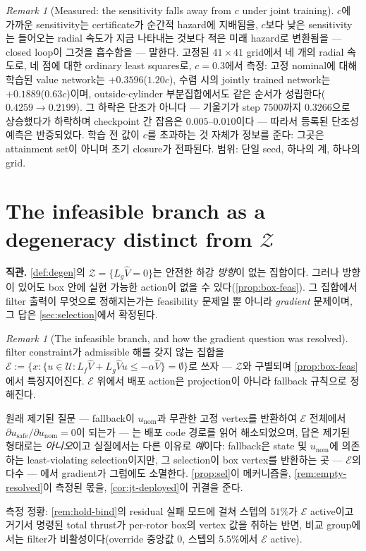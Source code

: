 \documentclass[11pt]{article}
\theoremstyle{plain}
\theoremstyle{definition}
\theoremstyle{remark}
\newtheorem{remark}[theorem]{Remark}
\newcommand{\calU}{\mathcal{U}}
\newcommand{\Vhat}{\widehat V}
\newcommand{\Lg}{L_g}
\newcommand{\Lf}{L_f}
\newcommand{\eqdef}{:=}
\begin{document}
\begin{remark}[Measured: the sensitivity falls away from $c$ under joint training]\label{rem:sens-measured}
$c$에 가까운 sensitivity는 certificate가 순간적 hazard에 지배됨을, $c$보다 낮은 sensitivity는
들어오는 radial 속도가 지금 나타내는 것보다 적은 미래 hazard로 변환됨을 --- closed loop이 그것을
흡수함을 --- 말한다. 고정된 $41\times41$ grid에서 네 개의 radial 속도로, 네 점에 대한 ordinary
least squares로, $c=0.3$에서 측정: 고정 nominal에 대해 학습된 value network는 $+0.3596$($1.20c$),
수렴 시의 jointly trained network는 $+0.1889$($0.63c$)이며, outside-cylinder 부분집합에서도 같은
순서가 성립한다($0.4259\to0.2199$). 그 하락은 단조가 아니다 --- 기울기가 step $7500$까지
$0.3266$으로 상승했다가 하락하며 checkpoint 간 잡음은 $0.005$--$0.010$이다 --- 따라서 등록된
단조성 예측은 반증되었다. 학습 전 값이 $c$를 초과하는 것 자체가 정보를 준다: 그곳은 attainment
set이 아니며 초기 closure가 전파된다. 범위: 단일 seed, 하나의 계, 하나의 grid.
\end{remark}

\section{The infeasible branch as a degeneracy distinct from \texorpdfstring{$\mathcal Z$}{Z}}\label{sec:empty}

\textbf{직관.} \cref{def:degen}의 $\mathcal Z=\{\Lg\Vhat=0\}$는 안전한 하강 \emph{방향}이 없는
집합이다. 그러나 방향이 있어도 box 안에 실현 가능한 action이 없을 수 있다(\cref{prop:box-feas}).
그 집합에서 filter 출력이 무엇으로 정해지는가는 feasibility 문제일 뿐 아니라 \emph{gradient}
문제이며, 그 답은 \cref{sec:selection}에서 확정된다.

\begin{remark}[The infeasible branch, and how the gradient question was resolved]\label{rem:empty-grad}
filter constraint가 admissible 해를 갖지 않는 집합을
$\mathcal E\eqdef\{x:\{u\in\calU:\Lf\Vhat+\Lg\Vhat u\le-\alpha\Vhat\}=\emptyset\}$로 쓰자 ---
$\mathcal Z$와 구별되며 \cref{prop:box-feas}에서 특징지어진다. $\mathcal E$ 위에서 배포 action은
projection이 아니라 fallback 규칙으로 정해진다.

원래 제기된 질문 --- fallback이 $u_{\mathrm{nom}}$과 무관한 고정 vertex를 반환하여 $\mathcal E$
전체에서 $\partial u_{\mathrm{safe}}/\partial u_{\mathrm{nom}}=0$이 되는가 --- 는 배포 code 경로를
읽어 해소되었으며, 답은 제기된 형태로는 \emph{아니오}이고 실질에서는 다른 이유로 \emph{예}이다:
fallback은 state 및 $u_{\mathrm{nom}}$에 의존하는 least-violating selection이지만, 그 selection이
box vertex를 반환하는 곳 --- $\mathcal E$의 다수 --- 에서 gradient가 그럼에도 소멸한다.
\cref{prop:sel}이 메커니즘을, \cref{rem:empty-resolved}이 측정된 몫을, \cref{cor:jt-deployed}이
귀결을 준다.

측정 정황: \cref{rem:hold-bind}의 residual 실패 모드에 걸쳐 스텝의 $51\%$가 $\mathcal E$ active이고
거기서 명령된 total thrust가 per-rotor box의 vertex 값을 취하는 반면, 비교 group에서는 filter가
비활성이다(override 중앙값 $0$, 스텝의 $5.5\%$에서 $\mathcal E$ active).
\end{remark}
\end{document}

